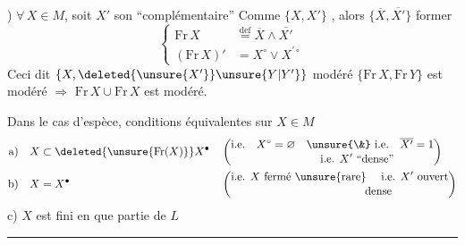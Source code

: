 ) $\forall\,X\in M$, soit $X'$ son ``complémentaire''  Comme $\{X,X'\}$ , alors $\{\overline X,\overline{X'}\}$   former
\[
\left\{\begin{aligned}
\mathrm{Fr}\,X &\overset{\text{def}}{=} \overline X\wedge\overline{X'}\\
(\mathrm{Fr}\,X)' &= X^{\circ}\vee X^{\prime\circ}
\end{aligned}\right.
\]
Ceci dit $\{X,\deleted{\unsure{X'}}\unsure{Y|Y'}\}$ modéré  $\{\mathrm{Fr}\,X,\mathrm{Fr}\,Y\}$ est modéré $\Longrightarrow$ $\mathrm{Fr}\,X\cup\mathrm{Fr}\,X$ est modéré.

   

Dans le cas d'espèce, conditions équivalentes sur $X\in M$
\[
\begin{aligned}
\text{a)}\quad & X\subset\deleted{\unsure{\mathrm{Fr}(X)}}X^{\bullet}
&&\left(\begin{aligned}&\text{i.e.}\quad X^{\circ}=\varnothing\quad\unsure{\&}\ \text{i.e.}\quad\overline{X'}=1\\[-2pt]&\hspace{8em}\text{i.e. }X'\text{ ``dense''}\end{aligned}\right)\\
\text{b)}\quad & X=X^{\bullet}
&&\left(\begin{aligned}&\text{i.e. }X\text{ fermé \unsure{rare} \quad i.e. }X'\text{ ouvert}\\[-2pt]&\hspace{12em}\text{dense}\end{aligned}\right)
\end{aligned}
\]
c) $X$ est fini en  que partie de $L$

\begin{center}\rule{1.6cm}{0.45pt}\end{center}

